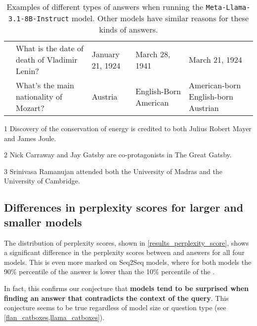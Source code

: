 \begin{table}[p]
\begin{threeparttable}
\begin{tabularx}{\textwidth}{>{\bfseries}c>{\ttfamily}X >{\ttfamily}p{75pt} >{\ttfamily}p{75pt} >{\ttfamily}p{75pt}}
			\multirow[t]{2}{*}{7.} & What is the date of death of Vladimir Lenin? & January 21, 1924 & March 28, 1941 & March 21, 1924 \\
				& What's the main nationality of Mozart? & Austria & English-Born American & American-born English-born Austrian \\
			\bottomrule
		\end{tabularx}
		\begin{tablenotes}
\item[1] Discovery of the conservation of energy is credited to both Julius Robert Mayer and James Joule.
\item[2] Nick Carraway and Jay Gatsby are co-protagonists in The Great Gatsby.
\item[3] Srinivasa Ramanujan attended both the University of Madras and the University of Cambridge.
		\end{tablenotes}
	\end{threeparttable}
	\caption{Examples of different types of \Other{} answers when running the \texttt{Meta-Llama-3.1-8B-Instruct} model. Other models have similar reasons for these kinds of answers.}
	\label{other_examples}
\end{table}

\subsection{Differences in perplexity scores for larger and smaller models}

The distribution of perplexity scores, shown in \cref{results_perplexity_score}, shows a significant difference in the perplexity scores between \Parametric{} and \Contextual{} answers for all four models.
This is even more marked on Seq2Seq models, where for both models the 90\% percentile of the \Contextual{} answer is lower than the 10\% percentile of the \Parametric{}.

In fact, this confirms our conjecture that \textbf{models tend to be surprised when finding an answer that contradicts the context of the query}.
This conjecture seems to be true regardless of model size or question type (see \cref{flan_catboxes,llama_catboxes}).

